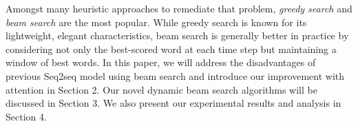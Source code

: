 \documentclass[11pt,a4paper]{article}
\begin{document}
Amongst many heuristic approaches to remediate that problem, \textit{greedy search} and \textit{beam search} are the most popular. While greedy search is known for its lightweight, elegant characteristics, beam search is generally better in practice by considering not only the best-scored word at each time step but maintaining a window of best words. 
In this paper, we will address the disadvantages of previous Seq2seq model using beam search and introduce our improvement with attention in Section 2. Our novel dynamic beam search algorithms will be discussed in Section 3. We also present our experimental results and analysis in Section 4.
\end{document}
